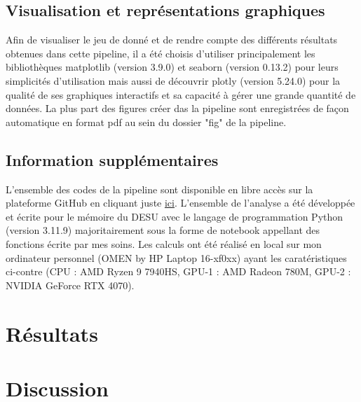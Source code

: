 \documentclass[11pt]{article}
\begin{document}

        \subsection*{Visualisation et représentations graphiques}
            Afin de visualiser le jeu de donné et de rendre compte des différents résultats obtenues dans cette pipeline, il a été choisis d'utiliser principalement les bibliothèques matplotlib (version 3.9.0) et seaborn (version 0.13.2) pour leurs simplicités d'utilisation mais aussi de découvrir plotly (version 5.24.0) pour la qualité de ses graphiques interactifs et sa capacité à gérer une grande quantité de données. La plus part des figures créer das la pipeline sont enregistrées de façon automatique en format pdf au sein du dossier "fig" de la pipeline.
            
        \subsection*{Information supplémentaires}
            L'ensemble des codes de la pipeline sont disponible en libre accès sur la plateforme GitHub en cliquant juste \href{https://github.com/alexandre-laine/Pipeline_Elections_Legislatives}{ici}. L'ensemble de l'analyse a été développée et écrite pour le mémoire du DESU avec le langage de programmation Python (version 3.11.9) majoritairement sous la forme de notebook appellant des fonctions écrite par mes soins. Les calculs ont été réalisé en local sur mon ordinateur personnel (OMEN by HP Laptop 16-xf0xx) ayant les caratéristiques ci-contre (CPU : AMD Ryzen 9 7940HS, GPU-1 : AMD Radeon 780M, GPU-2 : NVIDIA GeForce RTX 4070).

    \newpage
    \section{Résultats}

    \newpage
    \section{Discussion}

    \printbibliography
\end{document}
